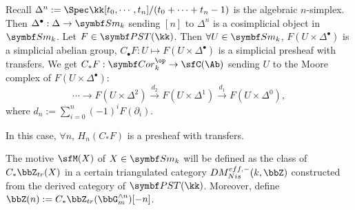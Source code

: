   Recall $\Delta^n := \Spec \kk[t_0,\cdots,t_n]/(t_0+\cdots+t_n-1)$ is the algebraic $n$-simplex.
  Then $\Delta^\bullet: \Delta \to \Sm_k$ sending $[n]$ to $\Delta^n$ is a cosimplicial object in $\Sm_k$.
  Let $F \in \PST(\kk)$.
  Then $\forall U \in \Sm_k$, $F(U\times \Delta^\bullet)$ is a simplicial abelian group, $C_\bullet F: U \mapsto F(U\times \Delta^\bullet)$ is a simplicial presheaf with transfers.
  We get $C_*F: \Cor^{\op}_k \to \sfC(\Ab)$ sending $U$ to the Moore complex of $F(U\times \Delta^\bullet)$:
  \[ \cdots \to F(U\times \Delta^2) \xrightarrow{d_2} F(U\times \Delta^1) \xrightarrow{d_1} F(U\times \Delta^0), \]
  where $d_n := \sum_{i=0}^n (-1)^i F(\partial_i)$.

  In this case, $\forall n$, $H_n(C_*F)$ is a presheaf with transfers.

  The motive $\sfM(X)$ of $X\in \Sm_k$ will be defined as the class of $C_*\bbZ_{tr}(X)$ in a certain triangulated category $DM_{Nis}^{eff,-}(k,\bbZ)$ constructed from the derived category of $\PST(\kk)$.
  Moreover, define $\bbZ(n) := C_*\bbZ_{tr}(\bbG_m^{\wedge n})[-n]$.
